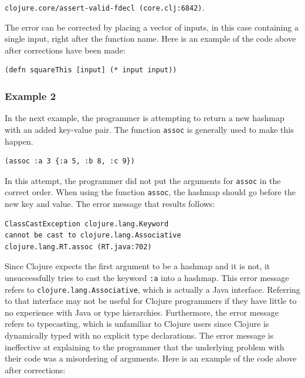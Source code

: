 \documentclass[12pt]{article}
\newcommand{\comment}[1]{{\bf \tt  {#1}}}
\newcommand{\emcomment}[1]{\textcolor{ForestGreen}{\comment{Elena: {#1}}}}
\begin{document}
\noindent
\texttt{clojure.core/assert-valid-fdecl (core.clj:6842)}.



The error can be corrected by placing a vector of inputs, in this case containing a single input, right after the function name.
Here is an example of the code above after corrections have been made:
\begin{verbatim}
(defn squareThis [input] (* input input))
\end{verbatim}

\subsubsection{Example 2}\label{sec:ex2}

In the next example, the programmer is attempting to return a new hashmap with an added key-value pair.
The function \texttt{assoc} is generally used to make this happen.
\begin{verbatim}
(assoc :a 3 {:a 5, :b 8, :c 9})
\end{verbatim}

In this attempt, the programmer did not put the arguments for \texttt{assoc} in the correct order.
When using the function \texttt{assoc}, the hashmap should go before the new key and value.
The error message that results follows:

\begin{verbatim}
ClassCastException clojure.lang.Keyword 
cannot be cast to clojure.lang.Associative
clojure.lang.RT.assoc (RT.java:702)
\end{verbatim}

Since Clojure expects the first argument to be a hashmap and it is not, it unsuccessfully tries to cast the keyword \texttt{:a} into a hashmap.
This error message refers to \texttt{clojure.lang.Associative}, which is actually a Java interface.
Referring to that interface may not be useful for Clojure programmers if they have little to no experience with Java or type hierarchies.
Furthermore, the error message refers to typecasting, which is unfamiliar to Clojure users since Clojure is dynamically typed with no explicit type declarations.
The error message is ineffective at explaining to the programmer that the underlying problem with their code was a misordering of arguments.
Here is an example of the code above after corrections:
 
\end{document}
